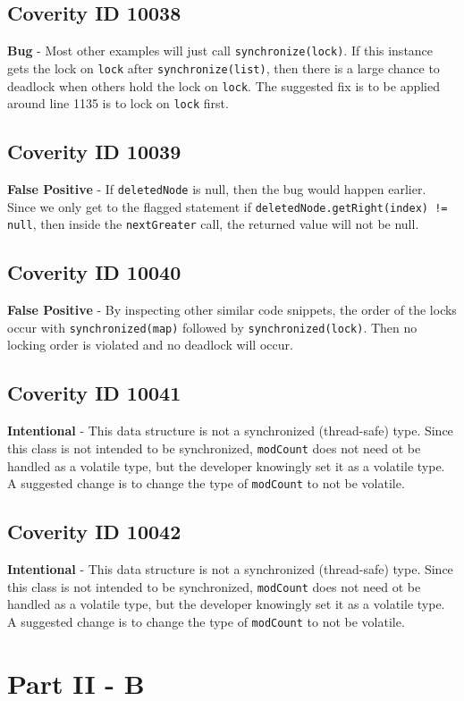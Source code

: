 \documentclass[12pt]{article}
\begin{document}
\subsection*{Coverity ID 10038}
\textbf{Bug} - Most other examples will just call \texttt{synchronize(lock)}. If this instance gets the lock on \texttt{lock} after \texttt{synchronize(list)}, then there is a large chance to deadlock when others hold the lock on \texttt{lock}. The suggested fix is to be applied around line 1135 is to lock on \texttt{lock} first.
\subsection*{Coverity ID 10039}
\textbf{False Positive} - If \texttt{deletedNode} is null, then the bug would happen earlier. Since we only get to the flagged statement if \texttt{deletedNode.getRight(index) != null}, then inside the \texttt{nextGreater} call, the returned value will not be null.
\subsection*{Coverity ID 10040}
\textbf{False Positive} - By inspecting other similar code snippets, the order of the locks occur with \texttt{synchronized(map)} followed by \texttt{synchronized(lock)}. Then no locking order is violated and no deadlock will occur.
\subsection*{Coverity ID 10041}
\textbf{Intentional} - This data structure is not a synchronized (thread-safe) type. Since this class is not intended to be synchronized, \texttt{modCount} does not need ot be handled as a volatile type, but the developer knowingly set it as a volatile type. A suggested change is to change the type of \texttt{modCount} to not be volatile.
\subsection*{Coverity ID 10042}
\textbf{Intentional} - This data structure is not a synchronized (thread-safe) type. Since this class is not intended to be synchronized, \texttt{modCount} does not need ot be handled as a volatile type, but the developer knowingly set it as a volatile type. A suggested change is to change the type of \texttt{modCount} to not be volatile.

\section*{Part II - B}
\end{document}
